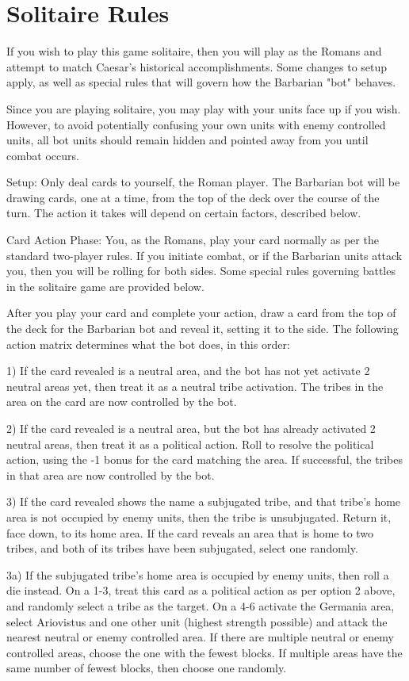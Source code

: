 \section{Solitaire Rules}

If you wish to play this game solitaire, then you will play as the Romans and attempt to match Caesar's historical accomplishments. Some changes to setup apply, as well as special rules that will govern how the Barbarian "bot" behaves.

Since you are playing solitaire, you may play with your units face up if you wish. However, to avoid potentially confusing your own units with enemy controlled units, all bot units should remain hidden and pointed away from you until combat occurs.

Setup: Only deal cards to yourself, the Roman player. The Barbarian bot will be drawing cards, one at a time, from the top of the deck over the course of the turn. The action it takes will depend on certain factors, described below.

Card Action Phase: You, as the Romans, play your card normally as per the standard two-player rules. If you initiate combat, or if the Barbarian units attack you, then you will be rolling for both sides. Some special rules governing battles in the solitaire game are provided below.

After you play your card and complete your action, draw a card from the top of the deck for the Barbarian bot and reveal it, setting it to the side. The following action matrix determines what the bot does, in this order:

1) If the card revealed is a neutral area, and the bot has not yet activate 2 neutral areas yet, then treat it as a neutral tribe activation. The tribes in the area on the card are now controlled by the bot.

2) If the card revealed is a neutral area, but the bot has already activated 2 neutral areas, then treat it as a political action. Roll to resolve the political action, using the -1 bonus for the card matching the area. If successful, the tribes in that area are now controlled by the bot.

3) If the card revealed shows the name a subjugated tribe, and that tribe's home area is not occupied by enemy units, then the tribe is unsubjugated. Return it, face down, to its home area. If the card reveals an area that is home to two tribes, and both of its tribes have been subjugated, select one randomly.

3a) If the subjugated tribe's home area is occupied by enemy units, then roll a die instead. On a 1-3, treat this card as a political action as per option 2 above, and randomly select a tribe as the target. On a 4-6 activate the Germania area, select Ariovistus and one other unit (highest strength possible) and attack the nearest neutral or enemy controlled area. If there are multiple neutral or enemy controlled areas, choose the one with the fewest blocks. If multiple areas have the same number of fewest blocks, then choose one randomly.

